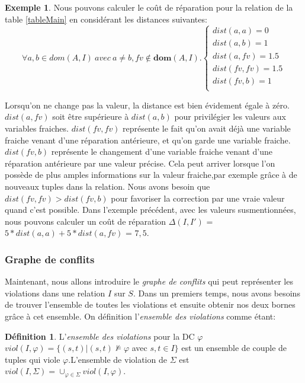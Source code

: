 \documentclass[letterpaper, 12pt]{report}
\theoremstyle{definition}
\newtheorem{mydef}{Définition}
\newtheorem{myexample}{Exemple}
\newcommand{\dom}{\mathbf{dom}}
\begin{document}
\begin{myexample}
\label{exampleDist}
Nous pouvons calculer le coût de réparation pour la relation de la table \ref{tableMain} en considérant les distances suivantes:\\

$$
\forall a,b \in dom(A,I) \ avec \ a \neq b, fv \not\in\dom(A,I).
\left\{
	\begin{array}{ll}
	   dist(a,a)=0\\
	   dist(a,b)=1\\
	   dist(a,fv)=1.5\\
	   dist(fv,fv)=1.5\\
	   dist(fv,b)=1\\
	\end{array}
\right.
$$

Lorsqu'on ne change pas la valeur, la distance est bien évidement égale à zéro. $dist(a,fv)$ soit être supérieure à $dist(a,b)$ pour privilégier les valeurs aux variables fraiches. $dist(fv,fv)$ représente le fait qu'on avait déjà une variable fraiche venant d'une réparation antérieure, et qu'on garde une variable fraiche. $dist(fv,b)$ représente le changement d'une variable fraiche venant d'une réparation antérieure par une valeur précise. Cela peut arriver lorsque l'on possède de plus amples informations sur la valeur fraiche,par exemple grâce à de nouveaux tuples dans la relation. Nous avons besoin que $dist(fv,fv) > dist(fv,b)$ pour favoriser la correction par une vraie valeur quand c'est possible. Dans l'exemple précédent, avec les valeurs susmentionnées, nous pouvons calculer un coût de réparation $\Delta(I,I')$ =$5*dist(a,a) + 5*dist(a,fv)$ = $7,5$.
\end {myexample}


\subsubsection{Graphe de conflits}

Maintenant, nous allons introduire le \emph{graphe de conflits} qui peut représenter les violations dans une relation $I$ sur $S$. Dans un premiers temps, nous avons besoins de trouver l'ensemble de toutes les violations et ensuite obtenir nos deux bornes grâce à cet ensemble. On définition l'\emph{ensemble des violations} comme étant: \cite{main}

\begin{mydef}
 L'\emph{ensemble des violations} pour la DC $\varphi$ $viol(I,\varphi) = \{ (s,t) | (s,t) \not\models \varphi $ avec $ s,t \in I \}$ est un ensemble de couple de tuples qui viole $\varphi$.L'ensemble de violation de $\Sigma$ est $viol(I,\Sigma) = \cup_{\varphi \in \Sigma}viol(I,\varphi)$. 
\end{mydef}
\end{document}
